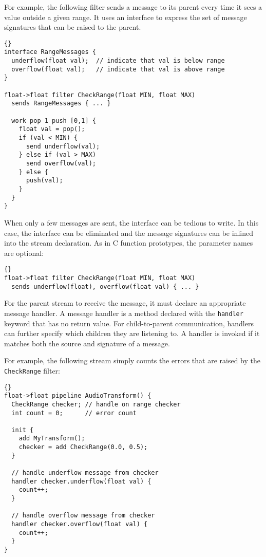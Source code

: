 For example, the following filter sends a message to its parent every
time it sees a value outside a given range.  It uses an interface to
express the set of message signatures that can be raised to the
parent.

\begin{lstlisting}{}
interface RangeMessages {
  underflow(float val);  // indicate that val is below range
  overflow(float val);   // indicate that val is above range
}

float->float filter CheckRange(float MIN, float MAX)
  sends RangeMessages { ... }

  work pop 1 push [0,1] {
    float val = pop();
    if (val < MIN) {
      send underflow(val);
    } else if (val > MAX)
      send overflow(val);
    } else {
      push(val);
    }
  }
}
\end{lstlisting}

When only a few messages are sent, the interface can be tedious to
write.  In this case, the interface can be eliminated and the message
signatures can be inlined into the stream declaration.  As in C
function prototypes, the parameter names are optional:

\begin{lstlisting}{}
float->float filter CheckRange(float MIN, float MAX) 
  sends underflow(float), overflow(float val) { ... }
\end{lstlisting}{}

For the parent stream to receive the message, it must declare an
appropriate message handler.  A message handler is a method declared
with the \lstinline|handler| keyword that has no return value.  For
child-to-parent communication, handlers can further specify which
children they are listening to.  A handler is invoked if it matches
both the source and signature of a message.

For example, the following stream simply counts the errors that are
raised by the \lstinline|CheckRange| filter:

\begin{lstlisting}{}
float->float pipeline AudioTransform() {
  CheckRange checker; // handle on range checker
  int count = 0;      // error count

  init {
    add MyTransform();
    checker = add CheckRange(0.0, 0.5);
  }

  // handle underflow message from checker
  handler checker.underflow(float val) {
    count++;
  }

  // handle overflow message from checker
  handler checker.overflow(float val) {
    count++;
  }
}
\end{lstlisting}{}


